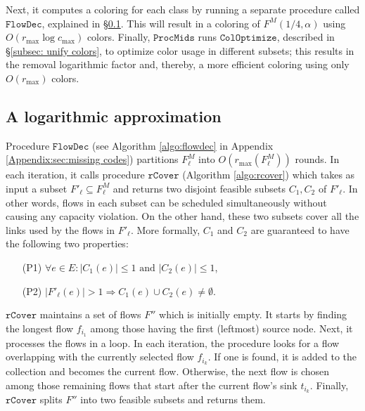 \documentclass[a4paper,UKenglish]{lipics-v2016}
\theoremstyle{plain}
\newcommand{\rmax}{r_{\max}}
\newcommand{\cmax}{c_{\max}}
\newcommand{\Fmid}{F^M}
\begin{document}
Next, it computes a coloring for each class by running a separate procedure called $\mathtt{FlowDec}$, explained in \S \ref{subsec: Procedure classschedule}.  This will result in a coloring of $\Fmid(1/4,\alpha)$ using $O(r_{\max} \log \cmax)$ colors. Finally, $\mathtt{ProcMids}$ runs $\mathtt{ColOptimize}$, described in \S\ref{subsec: unify colors}, to optimize color usage in different subsets; this results in the removal logarithmic factor and, thereby, a more efficient coloring using only $O(\rmax)$ colors. 

\subsection{A logarithmic approximation}
\label{subsec: Procedure classschedule}
Procedure $\mathtt{FlowDec}$ (see Algorithm \ref{algo:flowdec} in Appendix \ref{Appendix:sec:missing codes}) partitions $\Fmid_\ell$ into $O(r_{\max}(\Fmid_\ell))$ rounds. In each iteration, it calls procedure $\mathtt{rCover}$ (Algorithm \ref{algo:rcover}) which takes as input a subset $F'_\ell\subseteq \Fmid_\ell$ and returns two disjoint feasible subsets $C_1,C_2$ of $F'_\ell$. In other words, flows in each subset can be scheduled simultaneously without causing any capacity violation. On the other hand, these two subsets cover all the links used by the flows in $F'_\ell$. More formally, $C_1$ and $C_2$ are guaranteed to have the following two properties:

\begin{itemize}
\item [(P1)] $\forall e \in E : |C_1(e)|\leq 1 \text{ and } |C_2(e)|\leq 1$,
\item [(P2)] $|F'_\ell(e)| > 1 \Rightarrow C_1(e)\cup C_2(e)\neq\emptyset$.
\end{itemize}

$\mathtt{rCover}$ maintains a set of flows $F''$ which is initially empty. It starts by finding the longest flow $f_{i_1}$ among those having the first (leftmost) source node. Next, it processes the flows in a loop. In each iteration, the procedure looks for a flow overlapping with the currently selected flow $f_{i_k}$. If one is found, it is added to the collection and becomes the current flow. Otherwise, the next flow is chosen among those remaining flows that start after the current flow's sink $t_{i_k}$. Finally, $\mathtt{rCover}$ splits $F''$ into two feasible subsets and returns them.

%
\end{document}
